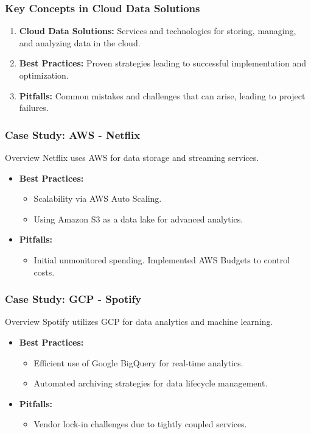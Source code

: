 \documentclass[aspectratio=169]{beamer}
\begin{document}
\begin{frame}[fragile]
    \frametitle{Key Concepts in Cloud Data Solutions}
    \begin{enumerate}
        \item \textbf{Cloud Data Solutions:} Services and technologies for storing, managing, and analyzing data in the cloud.
        \item \textbf{Best Practices:} Proven strategies leading to successful implementation and optimization.
        \item \textbf{Pitfalls:} Common mistakes and challenges that can arise, leading to project failures.
    \end{enumerate}
\end{frame}

\begin{frame}[fragile]
    \frametitle{Case Study: AWS - Netflix}
    \begin{block}{Overview}
        Netflix uses AWS for data storage and streaming services.
    \end{block}
    \begin{itemize}
        \item \textbf{Best Practices:}
        \begin{itemize}
            \item Scalability via AWS Auto Scaling.
            \item Using Amazon S3 as a data lake for advanced analytics.
        \end{itemize}
        \item \textbf{Pitfalls:}
        \begin{itemize}
            \item Initial unmonitored spending. Implemented AWS Budgets to control costs.
        \end{itemize}
    \end{itemize}
\end{frame}

\begin{frame}[fragile]
    \frametitle{Case Study: GCP - Spotify}
    \begin{block}{Overview}
        Spotify utilizes GCP for data analytics and machine learning.
    \end{block}
    \begin{itemize}
        \item \textbf{Best Practices:}
        \begin{itemize}
            \item Efficient use of Google BigQuery for real-time analytics.
            \item Automated archiving strategies for data lifecycle management.
        \end{itemize}
        \item \textbf{Pitfalls:}
        \begin{itemize}
            \item Vendor lock-in challenges due to tightly coupled services.
        \end{itemize}
    \end{itemize}
\end{frame}
\end{document}
